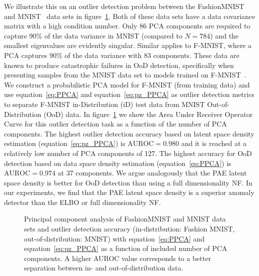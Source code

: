 \documentclass[10pt]{article} \usepackage[accepted]{tmlr}
\newcommand{\rev}[1]{{\color{black}#1}}
\begin{document}
We illustrate this on an outlier detection problem between the FashionMNIST~\citep{f-mnist} and MNIST~\citep{LecunMNIST} data sets in figure~\ref{fig:PPCA}. Both of these data sets have a data covariance matrix with a high condition number. Only 86 PCA components are required to capture 90\% of the data variance in MNIST (compared to $N{=}784$) and the smallest eigenvalues are evidently singular. Similar applies to F-MNIST, where a PCA captures 90\% of the data variance with 83 components. 
These data are known to produce catastrophic failures in OoD detection, specifically when presenting samples from the MNIST data set to models trained on F-MNIST~\citep{Nalisnick2019}.
We construct a probabilistic PCA model for F-MNIST (from training data) and use equation~\ref{eq:PPCA} and equation~\ref{eq:pz_PPCA} as outlier detection metrics to separate F-MNIST in-Distribution (iD) test data from MNIST Out-of-Distribution (OoD) data. In figure~\ref{fig:PPCA} we show the Area Under Receiver Operator Curve for this outlier detection task as a function of the number of PCA components. The highest outlier detection accuracy based on latent space density estimation (equation~\ref{eq:pz_PPCA}) is $\mathrm{AUROC}=0.980$ and it is reached at a relatively low number of PCA components of 127. The highest accuracy for OoD detection based on data space density estimation (equation~\ref{eq:PPCA}) is $\mathrm{AUROC}=0.974$ at 37 components.
\rev{We argue analogously that the PAE latent space density is better for OoD detection than using a full dimensionality NF.}
In our experiments, we find that the PAE latent space density is a superior anomaly detector than the ELBO \rev{ or full dimensionality NF}. 

\begin{figure}
\caption{\label{fig:PPCA} Principal component analysis of FashionMNIST and MNIST data sets and outlier detection accuracy (in-distribution: Fashion MNIST, out-of-distribution: MNIST) with equation~\ref{eq:PPCA} and equation~\ref{eq:pz_PPCA} as a function of included number of PCA components. A higher AUROC value corresponds to a better separation between in- and out-of-distribution data.}
\end{figure}
\end{document}
